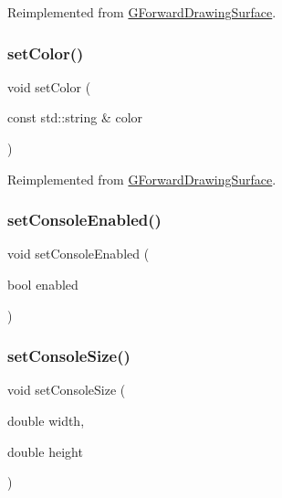 Reimplemented from \mbox{\hyperlink{classGForwardDrawingSurface_a292eb0ce61f3fdb1d28b17e1e34928f7}{G\+Forward\+Drawing\+Surface}}.

\mbox{\label{classGConsoleWindow_ad148324da1b0340e84e24dffa577ffca}} 
\subsubsection{\texorpdfstring{set\+Color()}{setColor()}\hspace{0.1cm}{\footnotesize\ttfamily [2/2]}}
{\footnotesize\ttfamily void set\+Color (\begin{DoxyParamCaption}\item[{const std\+::string \&}]{color }\end{DoxyParamCaption})\hspace{0.3cm}{\ttfamily [virtual]}}



Reimplemented from \mbox{\hyperlink{classGForwardDrawingSurface_ad148324da1b0340e84e24dffa577ffca}{G\+Forward\+Drawing\+Surface}}.

\mbox{\label{classGConsoleWindow_a452f7778aaba21498765444f907bb0a0}} 
\subsubsection{\texorpdfstring{set\+Console\+Enabled()}{setConsoleEnabled()}}
{\footnotesize\ttfamily void set\+Console\+Enabled (\begin{DoxyParamCaption}\item[{bool}]{enabled }\end{DoxyParamCaption})\hspace{0.3cm}{\ttfamily [static]}}

\mbox{\label{classGConsoleWindow_a85945ff6dea7bf9436a0f19b150e3d50}} 
\subsubsection{\texorpdfstring{set\+Console\+Size()}{setConsoleSize()}}
{\footnotesize\ttfamily void set\+Console\+Size (\begin{DoxyParamCaption}\item[{double}]{width,  }\item[{double}]{height }\end{DoxyParamCaption})\hspace{0.3cm}{\ttfamily [virtual]}}

